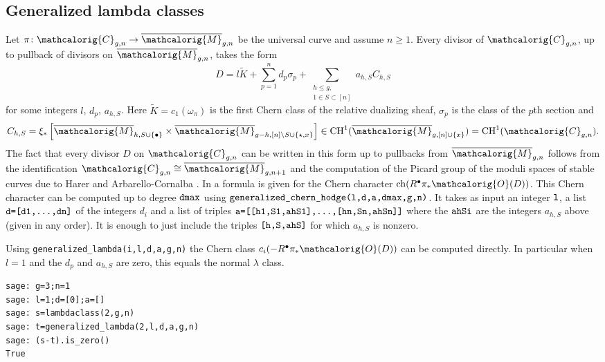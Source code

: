 \documentclass[11pt]{article}
\newcommand{\M}{\ensuremath{\overline{\mathcalorig{M}}}}
\begin{document}
\subsection{Generalized lambda classes} \label{Sect:generalizedlambda}
Let $\pi \colon \mathcalorig{C}_{g,n}\to \M_{g,n}$ be the universal curve and assume $n\geq 1$. Every divisor of $\mathcalorig{C}_{g,n}$, up to pullback of divisors on $\M_{g,n}$, takes the form
\[
D= l\tilde{K} + \sum^n_{p=1}d_p\sigma_p + \sum_{\substack{h\leq g,\\ 1\in S\subset [n]}}a_{h,S} C_{h,S}
\]
for some integers $l$, $d_p$, $a_{h,S}$.  Here $\tilde{K}=c_1(\omega_\pi)$ is the first Chern class of the relative dualizing sheaf,  $\sigma_p$ is the class of the $p$th section and
\[
C_{h,S} = \xi_* \left[\M_{h,S\cup\{\bullet\}} \times \M_{g-h,[n]\backslash S \cup \{\star,x\}}\right]\in \mathrm{CH}^1(\M_{g,[n]\cup\{x\}})=\mathrm{CH}^1(\mathcalorig{C}_{g,n}).
\]
The fact that every divisor $D$ on $\mathcalorig{C}_{g,n}$ can be written in this form up to pullbacks from $\M_{g,n}$ follows from the identification $\mathcalorig{C}_{g,n} \cong \M_{g,n+1}$ and the computation of the Picard group of the moduli spaces of stable curves due to Harer \cite{harer} and Arbarello-Cornalba \cite{arbarellocornalba}.
In \cite{PRvZ} a formula is given for the Chern character $\operatorname{ch}(R^\bullet\pi_*\mathcalorig{O} (D))$. This Chern character can be computed up to degree $\verb|dmax|$ using  $\verb|generalized_chern_hodge(l,d,a,dmax,g,n)|$. It takes as input an integer $\verb|l|$, a list $\verb|d=[d1,...,dn]|$ of the integers $d_i$ and a list of triples $\verb|a=[[h1,S1,ahS1],...,[hn,Sn,ahSn]]|$ where the $\verb|ahSi|$ are the integers $a_{h,S}$ above (given in any order). It is enough to just include the triples $\verb|[h,S,ahS]|$ for which $a_{h,S}$ is nonzero.


Using \verb|generalized_lambda(i,l,d,a,g,n)| the Chern class $c_i(-R^\bullet \pi_* \mathcalorig{O}(D))$ can be computed directly. In particular when $l=1$ and the $d_p$ and  $a_{h,S}$ are zero, this equals the normal $\lambda$ class.
\begin{lstlisting}
sage: g=3;n=1
sage: l=1;d=[0];a=[]
sage: s=lambdaclass(2,g,n)
sage: t=generalized_lambda(2,l,d,a,g,n)
sage: (s-t).is_zero()
True
\end{lstlisting}
\end{document}
